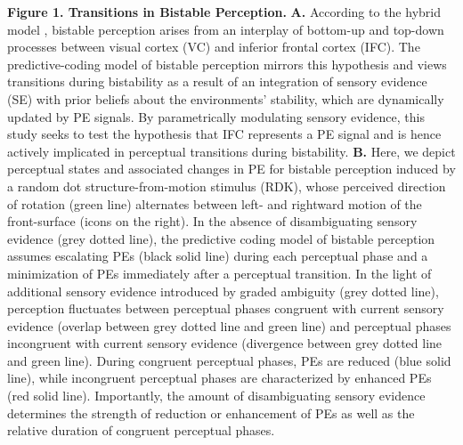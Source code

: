 \documentclass[12pt]{article}
\begin{document}
{\textbf{Figure 1. Transitions in Bistable Perception.} \textbf{A.} According to the hybrid model \parencite{Sterzer2009}, bistable perception arises from an interplay of bottom-up and top-down processes between visual cortex (VC) and inferior frontal cortex (IFC). The predictive-coding model of bistable perception \parencite{Hohwy2008a, Weilnhammer2017} mirrors this hypothesis and views transitions during bistability as a result of an integration of sensory evidence (SE) with prior beliefs about the environments’ stability, which are dynamically updated by PE signals. By parametrically modulating sensory evidence, this study seeks to test the hypothesis that IFC represents a PE signal and is hence actively implicated in perceptual transitions during bistability. \textbf{B.} Here, we depict perceptual states and associated changes in PE for bistable perception induced by a random dot structure-from-motion stimulus (RDK), whose perceived direction of rotation (green line) alternates between left- and rightward motion of the front-surface (icons on the right). In the absence of disambiguating sensory evidence (grey dotted line), the predictive coding model of bistable perception assumes escalating PEs (black solid line) during each perceptual phase and a minimization of PEs immediately after a perceptual transition. In the light of additional sensory evidence introduced by graded ambiguity (grey dotted line), perception fluctuates between perceptual phases congruent with current sensory evidence (overlap between grey dotted line and green line) and perceptual phases incongruent with current sensory evidence (divergence between grey dotted line and green line). During congruent perceptual phases, PEs are reduced (blue solid line), while incongruent perceptual phases are characterized by enhanced PEs (red solid line). Importantly, the amount of disambiguating sensory evidence determines the strength of reduction or enhancement of PEs as well as the relative duration of congruent perceptual phases.} 
\end{document}
